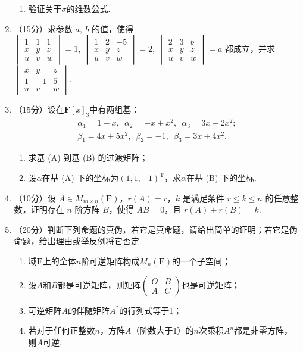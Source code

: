 \begin{enumerate}
\begin{enumerate}
        \item 验证关于$\sigma$的维数公式.
    \end{enumerate}
	\item （15分）求参数 $a,\ b$  的值，使得 $\begin{vmatrix}1 & 1 & 1 \\ x & y & z \\u & v & w\end{vmatrix}=1,\ \begin{vmatrix}1 & 2 & -5 \\ x & y & z \\u & v & w\end{vmatrix}=2,\ \begin{vmatrix}2 & 3 & b \\ x & y & z \\u & v & w\end{vmatrix}=a$ 都成立，并求$\begin{vmatrix}x & y & z \\ 1 & -1 & 5 \\u & v & w\end{vmatrix}$.
	\item （15分）设在$\mathbf{F}[x]_3$中有两组基：
    \begin{gather}
	    \alpha_1=1-x,\enspace\alpha_2=-x+x^2,\enspace\alpha_3=3x-2x^2; \tag{A} \\
        \beta_1=4x+5x^2,\enspace\beta_2=-1,\enspace\beta_3=3x+4x^2. \tag{B}
    \end{gather}
    \begin{enumerate}
        \item 求基 (A) 到基 (B) 的过渡矩阵；

        \item 设$\alpha$在基 (A) 下的坐标为$(1,1,-1)^{\mathrm{T}}$，求$\alpha$在基 (B) 下的坐标.
    \end{enumerate}
	\item （10分）设 $A \in M_{m \times n}(\mathbf{F})$，$r(A)=r$，$k$ 是满足条件 $r \leqslant k \leqslant n$ 的任意整数，证明存在 $n$ 阶方阵 $B$，使得 $AB=0$，且 $r(A)+r(B)=k$.
	\item （20分）判断下列命题的真伪，若它是真命题，请给出简单的证明；若它是伪命题，给出理由或举反例将它否定.
	\begin{enumerate}
        \item 域$\mathbf{F}$上的全体$n$阶可逆矩阵构成$M_n(\mathbf{F})$的一个子空间；

        \item 设$A$和$B$都是可逆矩阵，则矩阵$\begin{pmatrix}
            O & B \\ A & C
        \end{pmatrix}$也是可逆矩阵；

        \item 可逆矩阵$A$的伴随矩阵$A^*$的行列式等于1；

        \item 若对于任何正整数$n$，方阵$A$（阶数大于1）的$n$次乘积$A^n$都是非零方阵，则$A$可逆.
    \end{enumerate}
\end{enumerate}

\clearpage

